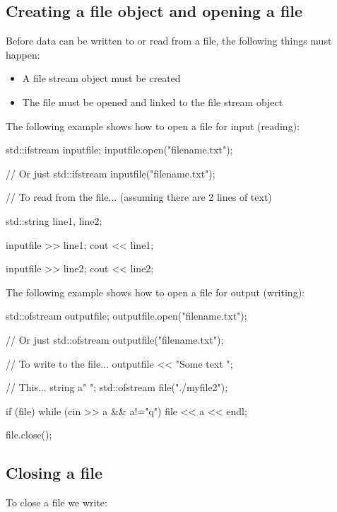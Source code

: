 \documentclass{report}
\begin{document}
    \pagebreak
    \subsection{Creating a file object and opening a file}
    \bigbreak \noindent 
    Before data can be written to or read from a file, the following things must happen:
    \begin{itemize}
        \item A file stream object must be created
        \item The file must be opened and linked to the file stream object
    \end{itemize}
    \bigbreak \noindent 
    The following example shows how to open a file for input (reading):
    \bigbreak \noindent 
    
    \begin{cppcode}
std::ifstream inputfile;
inputfile.open("filename.txt");

// Or just
std::ifstream inputfile("filename.txt");

// To read from the file... (assuming there are 2 lines of text)

std::string line1, line2;

inputfile >> line1;
cout << line1;

inputfile >> line2;
cout << line2;
    \end{cppcode}
    
    \bigbreak \noindent 
    The following example shows how to open a file for output (writing):
    \bigbreak \noindent 
    
    \begin{cppcode}
std::ofstream outputfile;
outputfile.open("filename.txt");

// Or just
std::ofstream outputfile("filename.txt");

// To write to the file...
outputfile << "Some text \n";

// This...
string a{" "};
std::ofstream file("./myfile2");

if (file) {
    while (cin >> a && a!="q") {
        file << a << endl;
    }
}

file.close();
    \end{cppcode}
    

    \bigbreak \noindent 
    \subsection{Closing a file}
    \bigbreak \noindent 
    To close a file we write:
    \bigbreak \noindent 
    
\end{document}
